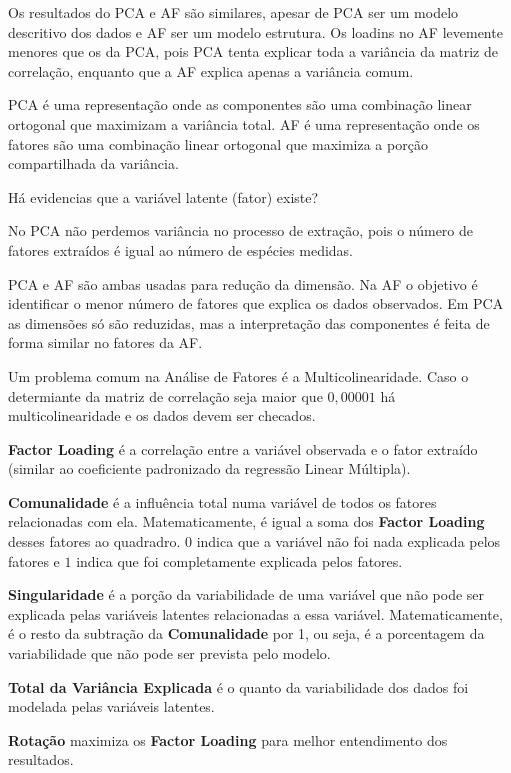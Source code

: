 Os resultados do PCA e AF são similares, apesar de PCA ser um modelo
descritivo dos dados e AF ser um modelo estrutura. 
Os loadins no AF levemente menores que os da PCA, pois PCA tenta
explicar toda a variância da matriz de correlação, enquanto que a AF
explica apenas a variância comum. 

PCA é uma representação onde as componentes são uma combinação linear 
ortogonal que maximizam a variância total.
AF é uma representação onde os fatores são uma combinação linear ortogonal
que maximiza a porção compartilhada da variância. 

Há evidencias que a variável latente (fator) existe?

No PCA não perdemos variância no processo de extração, pois 
o número de fatores extraídos é igual ao número de espécies medidas.

PCA e AF são ambas usadas para redução da dimensão. 
Na AF o objetivo é identificar o menor número de fatores que explica os 
dados observados. Em PCA as dimensões só são reduzidas, mas a 
interpretação das componentes é feita de forma similar no fatores da AF.

Um problema comum na Análise de Fatores é a Multicolinearidade. 
Caso o determiante da matriz de correlação seja maior que $0,00001$ 
há multicolinearidade e os dados devem ser checados. 

\textbf{Factor Loading} é a correlação entre a variável observada e o fator
extraído (similar ao coeficiente padronizado da regressão Linear Múltipla). 

\textbf{Comunalidade} é a influência total numa variável de todos os fatores 
relacionadas com ela. Matematicamente, é igual a soma dos \textbf{Factor Loading}
desses fatores ao quadradro. 
$0$ indica que a variável não foi nada explicada pelos fatores e $1$ indica 
que foi completamente explicada pelos fatores. 

\textbf{Singularidade} é a porção da variabilidade de uma variável que não 
pode ser explicada pelas variáveis latentes relacionadas a essa variável. 
Matematicamente, é o resto da subtração da \textbf{Comunalidade} por 1,
ou seja, é a porcentagem da variabilidade que não pode ser prevista pelo modelo.

\textbf{Total da Variância Explicada} é o quanto da variabilidade dos dados foi 
modelada pelas variáveis latentes. 

\textbf{Rotação} maximiza os \textbf{Factor Loading} para melhor 
entendimento dos resultados. 


